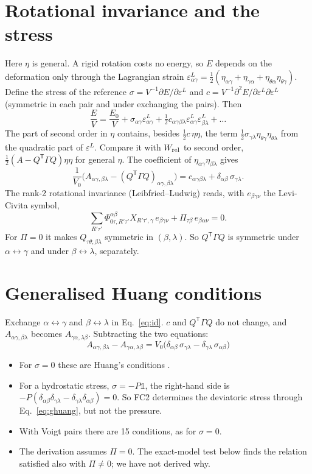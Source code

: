 \documentclass[11pt,a4paper]{article}
\newcommand{\al}{\alpha}\newcommand{\be}{\beta}\newcommand{\ga}{\gamma}\newcommand{\de}{\delta}
\newcommand{\la}{\lambda}\newcommand{\ep}{\varepsilon}\newcommand{\si}{\sigma}\newcommand{\Ga}{\Gamma}
\newcommand{\Id}{\mathbb{1}}
\begin{document}
\section{Rotational invariance and the stress}
Here $\eta$ is general. A rigid rotation costs no energy, so $E$ depends on the deformation only through
the Lagrangian strain $\ep^L_{\al\ga}=\tfrac12(\eta_{\al\ga}+\eta_{\ga\al}+\eta_{\theta\al}\eta_{\theta\ga})$. Define the
stress of the reference $\si=V^{-1}\partial E/\partial\ep^L$ and $c=V^{-1}\partial^2E/\partial\ep^L\partial\ep^L$
(symmetric in each pair and under exchanging the pairs). Then
\[
\frac EV=\frac{E_0}V+\si_{\al\ga}\ep^L_{\al\ga}+\tfrac12c_{\al\ga\be\la}\ep^L_{\al\ga}\ep^L_{\be\la}+\dots
\]
The part of second order in $\eta$ contains, besides $\tfrac12c\,\eta\eta$, the term
$\tfrac12\si_{\ga\la}\eta_{\theta\ga}\eta_{\theta\la}$ from the quadratic part of $\ep^L$. Compare it with $W_{\rm rel}$
to second order, $\tfrac12(A-Q^{\mathsf T}\Ga Q)\eta\eta$ for general $\eta$. The coefficient of $\eta_{\al\ga}\eta_{\be\la}$ gives
\begin{equation}
\frac1{V_0}\big(A_{\al\ga,\be\la}-(Q^{\mathsf T}\Ga Q)_{\al\ga,\be\la}\big)=c_{\al\ga\be\la}+\de_{\al\be}\,\si_{\ga\la}.
\label{eq:id}
\end{equation}
The rank-2 rotational invariance (Leibfried--Ludwig) reads, with $e_{\be\ga\nu}$ the Levi-Civita symbol,
\[
\sum_{R'\tau'}\Phi^{\al\be}_{0\tau,R'\tau'}X_{R'\tau',\ga}\,e_{\be\ga\nu}+\Pi_{\tau\be}\,e_{\be\al\nu}=0 .
\]
For $\Pi=0$ it makes $Q_{\tau\theta;\be\la}$ symmetric in $(\be,\la)$. So $Q^{\mathsf T}\Ga Q$ is symmetric
under $\al\leftrightarrow\ga$ and under $\be\leftrightarrow\la$, separately.

\section{Generalised Huang conditions}\label{sec:huang}
Exchange $\al\leftrightarrow\ga$ and $\be\leftrightarrow\la$ in Eq.~\eqref{eq:id}. $c$ and $Q^{\mathsf T}\Ga Q$ do not
change, and $A_{\al\ga,\be\la}$ becomes $A_{\ga\al,\la\be}$. Subtracting the two equations:
\begin{equation}
\boxed{\;A_{\al\ga,\be\la}-A_{\ga\al,\la\be}=V_0\big(\de_{\al\be}\,\si_{\ga\la}-\de_{\ga\la}\,\si_{\al\be}\big)\;}
\label{eq:ghuang}
\end{equation}
\begin{itemize}
\item For $\si=0$ these are Huang's conditions \cite{BornHuang}.
\item For a hydrostatic stress, $\si=-P\Id$, the right-hand side is
  $-P(\de_{\al\be}\de_{\ga\la}-\de_{\ga\la}\de_{\al\be})=0$. So FC2 determines the deviatoric stress
  through Eq.~\eqref{eq:ghuang}, but not the pressure.
\item With Voigt pairs there are 15 conditions, as for $\si=0$.
\item The derivation assumes $\Pi=0$. The exact-model test below finds the relation satisfied also with
  $\Pi\neq0$; we have not derived why.
\end{itemize}
\end{document}

